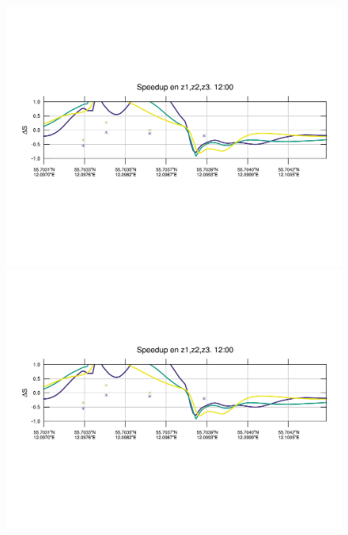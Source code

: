 \begin{figure}[H]
	\includegraphics[width=0.95\linewidth,trim={12mm 84mm 10mm 74mm},page=25,clip]{Imagenes/06/bol_da/speedup}\\%
	\includegraphics[width=0.95\linewidth,trim={12mm 84mm 10mm 74mm},page=37,clip]{Imagenes/06/bol_da/speedup}\\%

\end{figure}
